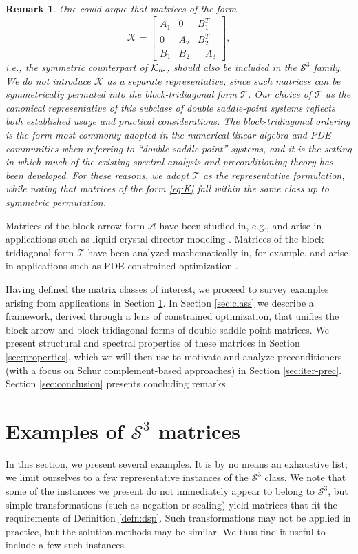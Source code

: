 \documentclass{article}
\newtheorem{remark}{Remark}
\newcommand{\st}{\mathcal{S}^3}
\newcommand{\sA}{\mathcal{A}}
\newcommand{\sK}{\mathcal{K}}
\newcommand{\sT}{\mathcal{T}}
\begin{document}
\begin{remark}
One could argue that matrices of the form
\begin{equation}
    \label{eq:K}
\sK  = \left[\begin{array}{ccc}
A_1 & 0 & B_1^T \\
0 & A_2 & B_2^T \\
B_1 & B_2 & -A_3
\end{array}\right],
\end{equation}
i.e., the symmetric counterpart of $\sK_{\rm ns}$, should also be included in the $\st$ family.
We do not introduce $\sK$ as a separate representative, since such matrices can be symmetrically permuted into the block-tridiagonal form $\sT$. Our choice of $\sT$ as the canonical representative of this subclass of double saddle-point systems reflects both established usage and practical considerations. The block-tridiagonal ordering is the form most commonly adopted in the numerical linear algebra and PDE communities when referring to ``double saddle-point'' systems, and it is the setting in which much of the existing spectral analysis and preconditioning theory has been developed. For these reasons, we adopt $\sT$ as the representative formulation, while noting that matrices of the form \eqref{eq:K} fall within the same class up to symmetric permutation.
\end{remark}

Matrices of the block-arrow form $\sA$ have been studied in, e.g., \cite{bb18,bb19} and arise in applications such as liquid crystal director modeling \cite{rg13}.
Matrices of the block-tridiagonal  form $\sT$ have been analyzed mathematically in, for example, \cite{ak25, bmpp25, bg22, sz18} and arise in applications such as PDE-constrained optimization \cite{bmpp24}.

Having defined the matrix classes of interest, we proceed to survey examples arising from applications in Section \ref{sec:applications}. In Section \ref{sec:class} we describe a framework, derived through a lens of constrained optimization, that unifies the block-arrow and block-tridiagonal forms of double saddle-point matrices. We present structural and spectral properties of these matrices in Section \ref{sec:properties}, which we will then use to motivate and analyze preconditioners (with a focus on Schur complement-based approaches) in Section \ref{sec:iter-prec}. Section \ref{sec:conclusion} presents concluding remarks.

\section{Examples of $\st$ matrices}
\label{sec:applications}
In this section, we present several examples. It is by no means an exhaustive list; we limit ourselves to a few representative instances of the $\st$ class. We note that some of the instances we present do not immediately appear to belong to $\st$, but simple transformations (such as negation or scaling) yield matrices that fit the requirements of Definition \ref{defn:dsp}. Such transformations may not be applied in practice, but the solution methods may be similar. We thus find it useful to include a few such instances.
\end{document}
